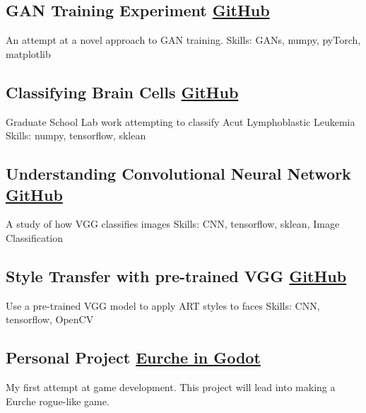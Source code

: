 \subsection{GAN Training Experiment \hfill 	\href{https://nbviewer.org/github/stevenjohnlarsen/GAN-discriminator-refresh-learning/blob/main/GraphsForPaper-No-Feature-Matching.ipynb}{GitHub}}
An attempt at a novel approach to GAN training. 
\hfill Skills: GANs, numpy, pyTorch, matplotlib

\vspace*{0.5em}

\subsection{Classifying Brain Cells \hfill \href{https://nbviewer.org/github/nlarsensmu/CNN/blob/master/Merged\%20work.ipynb}{GitHub} }
Graduate School Lab work attempting to classify Acut Lymphoblastic Leukemia 
\hfill Skills: numpy, tensorflow, sklean


\vspace*{0.5em}

\subsection{Understanding Convolutional Neural Network \hfill \href{https://nbviewer.org/github/nlarsensmu/Visualizing-VGG/blob/master/Lab2-Class-Approch.ipynb}{GitHub} }
A study of how VGG classifies images
\hfill Skills: CNN, tensorflow, sklean, Image Classification

\vspace*{0.5em}

\subsection{Style Transfer with pre-trained VGG \hfill \href{https://nbviewer.org/github/stevenjohnlarsen/StyleTransfer/blob/main/StyleTransfer2.ipynb}{GitHub}}
Use a pre-trained VGG model to apply ART styles to faces
\hfill Skills: CNN, tensorflow, OpenCV

\vspace*{0.5em}

\subsection{Personal Project \hfill \href{https://github.com/nlarsen31/EurcheGoDot}{Eurche in Godot}}
My first attempt at game development. This project will lead into making a Eurche rogue-like game.
